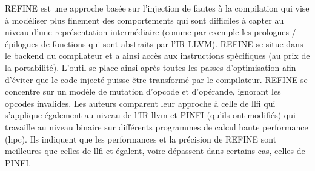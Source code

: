                 REFINE \cite{Georgakoudis/ICHPCNSA17} est une approche basée sur l'injection de fautes à la compilation qui vise à modéliser plus finement des comportements qui sont difficiles à capter au niveau d'une représentation intermédiaire (comme par exemple les prologues / épilogues de fonctions qui sont abstraits par l'IR LLVM).
                REFINE se situe dans le backend du compilateur et a ainsi accès aux instructions spécifiques (au prix de la portabilité).
                L'outil se place ainsi après toutes les passes d'optimisation afin d'éviter que le code injecté puisse être transformé par le compilateur. 
                REFINE se concentre sur un modèle de mutation d'opcode et d'opérande, ignorant les opcodes invalides.
                Les auteurs comparent leur approche à celle de \gls{llfi} qui s'applique également au niveau de l'IR \gls{llvm} et PINFI (qu'ils ont modifiés) qui travaille au niveau binaire sur différents programmes de calcul haute performance (\gls{hpc}).
                Ils indiquent que les performances et la précision de REFINE sont meilleures que celles de \gls{llfi} et égalent, voire dépassent dans certains cas, celles de PINFI. 
            
